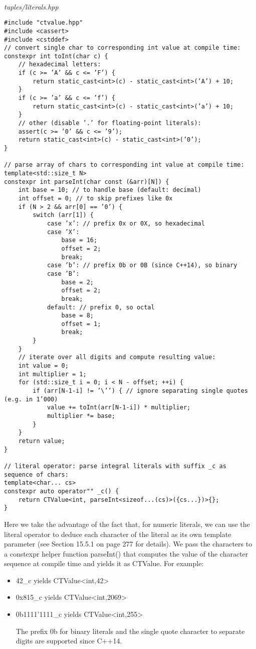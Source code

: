 \hspace*{\fill} \\ %
\noindent
\textit{tuples/literals.hpp}
\begin{lstlisting}[style=styleCXX]
#include "ctvalue.hpp"
#include <cassert>
#include <cstddef>
// convert single char to corresponding int value at compile time:
constexpr int toInt(char c) {
	// hexadecimal letters:
	if (c >= ’A’ && c <= ’F’) {
		return static_cast<int>(c) - static_cast<int>(’A’) + 10;
	}
	if (c >= ’a’ && c <= ’f’) {
		return static_cast<int>(c) - static_cast<int>(’a’) + 10;
	}
	// other (disable ’.’ for floating-point literals):
	assert(c >= ’0’ && c <= ’9’);
	return static_cast<int>(c) - static_cast<int>(’0’);
}

// parse array of chars to corresponding int value at compile time:
template<std::size_t N>
constexpr int parseInt(char const (&arr)[N]) {
	int base = 10; // to handle base (default: decimal)
	int offset = 0; // to skip prefixes like 0x
	if (N > 2 && arr[0] == ’0’) {
		switch (arr[1]) {
			case ’x’: // prefix 0x or 0X, so hexadecimal
			case ’X’:
				base = 16;
				offset = 2;
				break;
			case ’b’: // prefix 0b or 0B (since C++14), so binary
			case ’B’:
				base = 2;
				offset = 2;
				break;
			default: // prefix 0, so octal
				base = 8;
				offset = 1;
				break;
		}
	}
	// iterate over all digits and compute resulting value:
	int value = 0;
	int multiplier = 1;
	for (std::size_t i = 0; i < N - offset; ++i) {
		if (arr[N-1-i] != ’\’’) { // ignore separating single quotes (e.g. in 1’000)
			value += toInt(arr[N-1-i]) * multiplier;
			multiplier *= base;
		}
	}
	return value;
}

// literal operator: parse integral literals with suffix _c as sequence of chars:
template<char... cs>
constexpr auto operator"" _c() {
	return CTValue<int, parseInt<sizeof...(cs)>({cs...})>{};
}
\end{lstlisting}

Here we take the advantage of the fact that, for numeric literals, we can use the literal operator to deduce each character of the literal as its own template parameter (see Section 15.5.1 on page 277 for details). We pass the characters to a constexpr helper function parseInt() that computes the value of the character sequence at compile time and yields it as CTValue. For example:

\begin{itemize}
\item 
42\_c yields CTValue<int,42>

\item 
0x815\_c yields CTValue<int,2069>

\item 
0b1111’1111\_c yields CTValue<int,255>

\begin{tcolorbox}[colback=webgreen!5!white,colframe=webgreen!75!black]
\hspace*{0.75cm}The prefix 0b for binary literals and the single quote character to separate digits are supported since C++14.
\end{tcolorbox}
\end{itemize}

